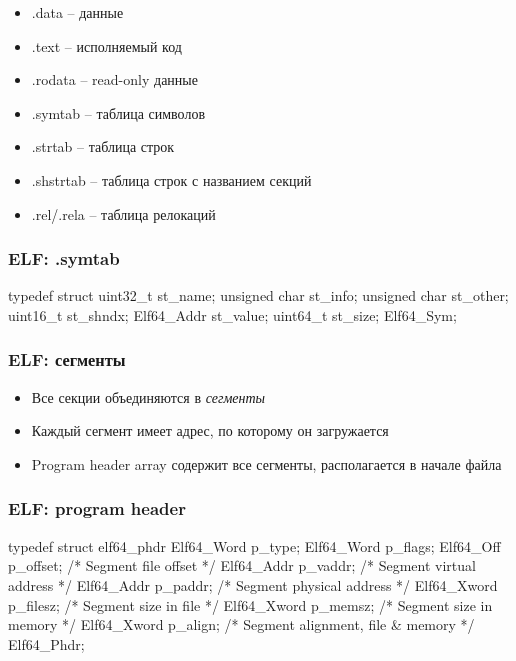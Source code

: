   \begin{itemize}
    \item .data -- данные
    \item .text -- исполняемый код
    \item .rodata -- read-only данные
    \item .symtab -- таблица символов
    \item .strtab -- таблица строк
    \item .shstrtab -- таблица строк с названием секций
    \item .rel/.rela -- таблица релокаций
  \end{itemize}
  
\subsubsection{ELF: .symtab}
  \begin{cminted}
typedef struct {
    uint32_t      st_name;
    unsigned char st_info;
    unsigned char st_other;
    uint16_t      st_shndx;
    Elf64_Addr    st_value;
    uint64_t      st_size;
} Elf64_Sym;
  \end{cminted}
  
\subsubsection{ELF: сегменты}
  \begin{itemize}
    \item Все секции объединяются в \textit{сегменты}
    \item Каждый сегмент имеет адрес, по которому он загружается
    \item Program header array содержит все сегменты, располагается в начале файла
  \end{itemize}
  
\subsubsection{ELF: program header}
  \begin{cminted}
typedef struct elf64_phdr {
  Elf64_Word p_type;
  Elf64_Word p_flags;
  Elf64_Off p_offset;    /* Segment file offset */
  Elf64_Addr p_vaddr;    /* Segment virtual address */
  Elf64_Addr p_paddr;    /* Segment physical address */
  Elf64_Xword p_filesz;    /* Segment size in file */
  Elf64_Xword p_memsz;    /* Segment size in memory */
  Elf64_Xword p_align;    /* Segment alignment, file & memory */
} Elf64_Phdr;
  \end{cminted}


